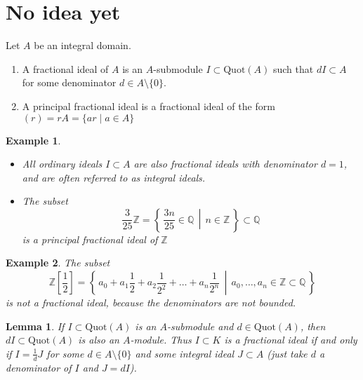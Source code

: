 \documentclass[a4paper]{book}
\theoremstyle{break}
\newtheorem{example}{Example}
\theoremstyle{plain}
\newtheorem{lemma}{Lemma}[definition]
\begin{document}
\section{No idea yet}

\begin{definition}
    Let \(A\) be an {\color{mathif}integral domain}.
    \begin{enumerate}
        \item A {\color{maththen}fractional ideal} of \(A\) is an {\color{mathif}\(A\)-submodule} \(I \subset \text{Quot}(A)\) such that \(d I \subset A\) for some {\color{mathrem}denominator} \(d \in A \setminus \{0\}\).
        \item A {\color{maththen}principal fractional ideal} is a {\color{mathif}fractional ideal} of the form \((r) = rA = \{ar \mid a \in A\}\)
    \end{enumerate}
\end{definition}

\begin{example}
    \begin{itemize}
        \item All ordinary ideals \(I \subset A\) are also fractional ideals with denominator \(d = 1\), and are often referred to as {\color{mathrem}integral ideals}.
        \item The subset
        \begin{equation}
            \frac{3}{25}\mathbb{Z} = \left\{\, \frac{3n}{25} \in \mathbb{Q} \,\middle|\, n \in \mathbb{Z} \,\right\} \subset \mathbb{Q}
        \end{equation}
        is a principal fractional ideal of \(\mathbb{Z}\)
    \end{itemize}
\end{example}

\begin{example}
    The subset
    \begin{equation}
        \mathbb{Z}\left[\frac{1}{2}\right] = \left\{\, a_0 + a_1 \frac{1}{2} + a_2 \frac{1}{2^2} + \dots + a_n \frac{1}{2^n} \,\middle|\, a_0, \dots, a_n \in \mathbb{Z} \subset \mathbb{Q} \,\right\}
    \end{equation}
    is not a fractional ideal, because the denominators are not bounded.
\end{example}

\begin{lemma}
    If \(I \subset \text{Quot}(A)\) is an \(A\)-submodule and \(d \in \text{Quot}(A)\), then \(dI \subset \text{Quot}(A)\) is also an \(A\)-module. Thus \(I \subset K\) is a fractional ideal if and only if \(I = \frac{1}{d} J\) for some \(d \in A \setminus \{0\}\) and some integral ideal \(J \subset A\) (just take \(d\) a denominator of \(I\) and \(J = dI\)).
\end{lemma}
\end{document}
